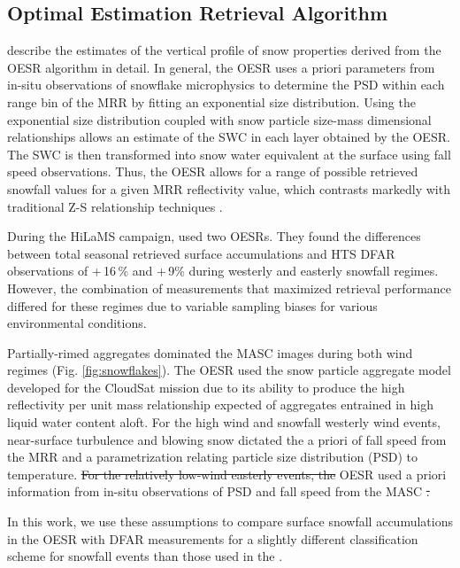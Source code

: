 \documentclass{ametsocV5}
\providecommand{\DIFadd}[1]{{\protect\color{blue}\uwave{#1}}} %
\providecommand{\DIFdel}[1]{{\protect\color{red}\sout{#1}}}                      %
\providecommand{\DIFaddbegin}{} %
\providecommand{\DIFaddend}{} %
\providecommand{\DIFdelbegin}{} %
\providecommand{\DIFdelend}{} %
\newcommand{\DIFscaledelfig}{0.5}
\newlength{\DIFdelgraphicswidth} %
\newlength{\DIFdelgraphicsheight} %
\newcommand{\DIFaddincludegraphics}[2][]{{\color{blue}\fbox{\DIFOincludegraphics[#1]{#2}}}} %
\newcommand{\DIFdelincludegraphics}[2][]{%
\sbox{\DIFdelgraphicsbox}{\DIFOincludegraphics[#1]{#2}}%
\settoboxwidth{\DIFdelgraphicswidth}{\DIFdelgraphicsbox} %
\settoboxtotalheight{\DIFdelgraphicsheight}{\DIFdelgraphicsbox} %
\scalebox{\DIFscaledelfig}{%
\parbox[b]{\DIFdelgraphicswidth}{\usebox{\DIFdelgraphicsbox}\\[-\baselineskip] \rule{\DIFdelgraphicswidth}{0em}}\llap{\resizebox{\DIFdelgraphicswidth}{\DIFdelgraphicsheight}{%
\setlength{\unitlength}{\DIFdelgraphicswidth}%
\begin{picture}(1,1)%
\thicklines\linethickness{2pt} %
{\color[rgb]{1,0,0}\put(0,0){\framebox(1,1){}}}%
{\color[rgb]{1,0,0}\put(0,0){\line( 1,1){1}}}%
{\color[rgb]{1,0,0}\put(0,1){\line(1,-1){1}}}%
\end{picture}%
}\hspace*{3pt}}} %
} %
\DeclareRobustCommand{\DIFaddbegin}{\DIFOaddbegin \let\includegraphics\DIFaddincludegraphics} %
\DeclareRobustCommand{\DIFaddend}{\DIFOaddend \let\includegraphics\DIFOincludegraphics} %
\DeclareRobustCommand{\DIFdelbegin}{\DIFOdelbegin \let\includegraphics\DIFdelincludegraphics} %
\DeclareRobustCommand{\DIFdelend}{\DIFOaddend \let\includegraphics\DIFOincludegraphics} %
\begin{document}
	\subsection{Optimal Estimation Retrieval Algorithm}\label{sec:methodology:oesr}
		\citet{schirle_estimation_2019} describe the estimates of the vertical profile of snow properties derived from the OESR algorithm in detail. In general, the OESR uses a priori parameters from in-situ observations of snowflake microphysics to determine the PSD within each range bin of the MRR by fitting an exponential size distribution. Using the exponential size distribution coupled with snow particle size-mass dimensional relationships allows an estimate of the SWC in each layer obtained by the OESR. The SWC is then transformed into snow water equivalent at the surface using fall speed observations. Thus, the OESR allows for a range of possible retrieved snowfall values for a given MRR reflectivity value, which contrasts markedly with traditional Z-S relationship techniques \citep{friedrich_quantifying_2020}.  

		During the HiLaMS campaign, \citet{schirle_estimation_2019} used two OESRs. They found the differences between total seasonal retrieved surface accumulations and HTS DFAR observations of +\,16\,\% and +\,9\% during westerly and easterly snowfall regimes. However, the combination of measurements that maximized retrieval performance differed for these regimes due to variable sampling biases for various environmental conditions. 

		Partially-rimed aggregates dominated the MASC images during both wind regimes (Fig. \ref{fig:snowflakes}). The OESR used the snow particle aggregate model \citep{wood_microphysical_2015} developed for the CloudSat mission due to its ability to produce the high reflectivity per unit mass relationship expected of aggregates entrained in high liquid water content aloft. For the high wind and snowfall westerly wind events, near-surface turbulence and blowing snow dictated the a priori of fall speed from the MRR and a parametrization relating particle size distribution (PSD) to temperature. \DIFdelbegin \DIFdel{For the relatively low-wind easterly events, the }\DIFdelend \DIFaddbegin \DIFadd{The }\DIFaddend OESR used a priori information from in-situ observations of PSD and fall speed from the MASC \DIFdelbegin \DIFdel{. 
		}%

\DIFdelend \DIFaddbegin \DIFadd{for the relatively low-wind easterly events. }\DIFaddend In this work, we use these assumptions to compare surface snowfall accumulations in the OESR with DFAR measurements for a slightly different classification scheme for snowfall events than those used in the \citet{schirle_estimation_2019}. 
		\DIFaddbegin 
\end{document}
